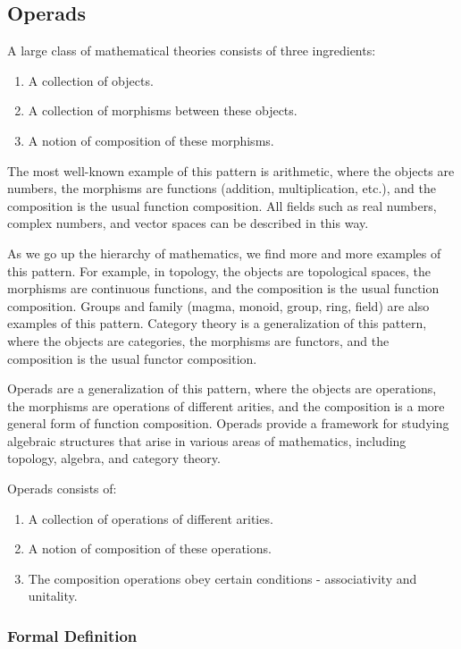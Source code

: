 
\subsection{Operads}

A large class of mathematical theories consists of three ingredients:
\begin{enumerate}
  \item A collection of objects.
  \item A collection of morphisms between these objects.
  \item A notion of composition of these morphisms.
\end{enumerate}

The most well-known example of this pattern is arithmetic, where the objects are numbers, the morphisms are functions (addition, multiplication, etc.), and the composition is the usual function composition. All fields such as real numbers, complex numbers, and vector spaces can be described in this way.

As we go up the hierarchy of mathematics, we find more and more examples of this pattern. For example, in topology, the objects are topological spaces, the morphisms are continuous functions, and the composition is the usual function composition. Groups and family (magma, monoid, group, ring, field) are also examples of this pattern. Category theory is a generalization of this pattern, where the objects are categories, the morphisms are functors, and the composition is the usual functor composition.

Operads are a generalization of this pattern, where the objects are operations, the morphisms are operations of different arities, and the composition is a more general form of function composition. Operads provide a framework for studying algebraic structures that arise in various areas of mathematics, including topology, algebra, and category theory.

Operads consists of:

\begin{enumerate}
  \item A collection of operations of different arities.
  \item A notion of composition of these operations.
  \item The composition operations obey certain conditions - associativity and unitality.
\end{enumerate}

\subsubsection{Formal Definition}

